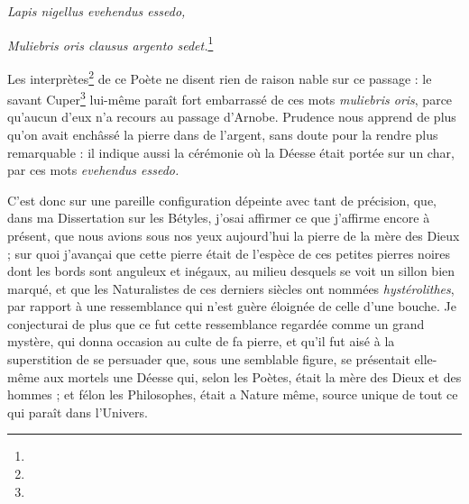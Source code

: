 \documentclass[a4paper, 11pt, oneside, polutonikogreek, french]{article}
\begin{document}
\emph{Lapis nigellus evehendus essedo,}  

\emph{Muliebris oris clausus argento sedet.}\footnote{}

Les interprètes\footnote{} de ce Poète ne disent rien de raison nable sur ce passage : le savant Cuper\footnote{} lui-même paraît fort embarrassé de ces mots \emph{muliebris oris}, parce qu'aucun d'eux n'a recours au passage d'Arnobe. Prudence nous apprend de plus qu'on avait enchâssé la pierre dans de l'argent, sans doute pour la rendre plus remarquable : il indique aussi la cérémonie où la Déesse était portée sur un char, par ces mots \emph{evehendus essedo.}

C'est donc sur une pareille configuration dépeinte avec tant de précision, que, dans ma Dissertation sur les Bétyles, j'osai affirmer ce que j'affirme encore à présent, que nous avions sous nos yeux aujourd'hui la pierre de la mère des Dieux ; sur quoi j'avançai que cette pierre était de l'espèce de ces petites pierres noires dont les bords sont anguleux et inégaux, au milieu desquels se voit un sillon bien marqué, et que les Naturalistes de ces derniers siècles ont nommées \emph{hystérolithes}, par rapport à une ressemblance qui n'est guère éloignée de celle d'une bouche. Je conjecturai de plus que ce fut cette ressemblance regardée comme un grand mystère, qui donna occasion au culte de fa pierre, et qu'il fut aisé à la superstition de se persuader que, sous une semblable figure, se présentait elle-même aux mortels une Déesse qui, selon les Poètes, était la mère des Dieux et des hommes ; et félon les Philosophes, était a Nature même, source unique de tout ce qui paraît dans l'Univers.
\end{document}

